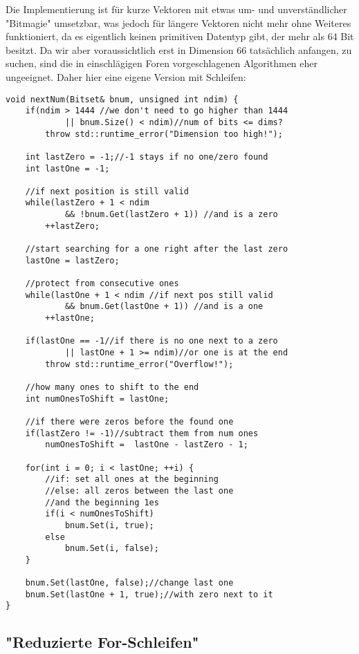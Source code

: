 \documentclass{article}
\begin{document}
Die Implementierung ist für kurze Vektoren mit etwas um- und unverständlicher "Bitmagie" umsetzbar, was jedoch für längere Vektoren nicht mehr ohne Weiteres funktioniert, da es eigentlich keinen primitiven Datentyp gibt, der mehr als 64 Bit besitzt. Da wir aber voraussichtlich erst in Dimension 66 tatsächlich anfangen, zu suchen, sind die in einschlägigen Foren vorgeschlagenen Algorithmen eher ungeeignet. Daher hier eine eigene Version mit Schleifen:

\clearpage

\lstset{language=C++}

\begin{lstlisting}[frame=single]
void nextNum(Bitset& bnum, unsigned int ndim) {
    if(ndim > 1444 //we don't need to go higher than 1444
            || bnum.Size() < ndim)//num of bits <= dims?
        throw std::runtime_error("Dimension too high!");

    int lastZero = -1;//-1 stays if no one/zero found
    int lastOne = -1;

    //if next position is still valid
    while(lastZero + 1 < ndim
            && !bnum.Get(lastZero + 1)) //and is a zero
        ++lastZero;

    //start searching for a one right after the last zero
    lastOne = lastZero;

    //protect from consecutive ones
    while(lastOne + 1 < ndim //if next pos still valid
            && bnum.Get(lastOne + 1)) //and is a one
        ++lastOne;

    if(lastOne == -1//if there is no one next to a zero
            || lastOne + 1 >= ndim)//or one is at the end
        throw std::runtime_error("Overflow!");

    //how many ones to shift to the end
    int numOnesToShift = lastOne;

    //if there were zeros before the found one
    if(lastZero != -1)//subtract them from num ones
        numOnesToShift =  lastOne - lastZero - 1;

    for(int i = 0; i < lastOne; ++i) {
        //if: set all ones at the beginning
        //else: all zeros between the last one
        //and the beginning 1es
        if(i < numOnesToShift)
            bnum.Set(i, true);
        else
            bnum.Set(i, false);
    }

    bnum.Set(lastOne, false);//change last one
    bnum.Set(lastOne + 1, true);//with zero next to it
}
\end{lstlisting}

\subsection{"Reduzierte For-Schleifen"}
\end{document}
